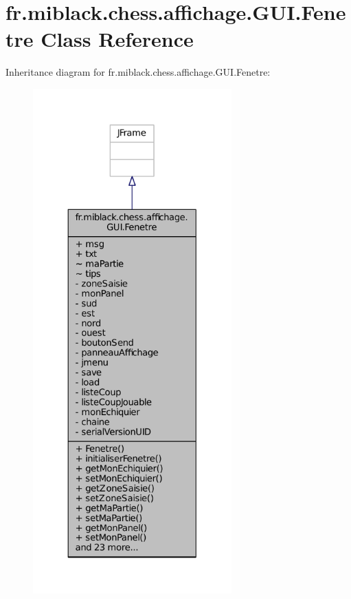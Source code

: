 \section{fr.\-miblack.\-chess.\-affichage.\-G\-U\-I.\-Fenetre Class Reference}
\label{classfr_1_1miblack_1_1chess_1_1affichage_1_1GUI_1_1Fenetre}


Inheritance diagram for fr.\-miblack.\-chess.\-affichage.\-G\-U\-I.\-Fenetre\-:
\nopagebreak
\begin{figure}[H]
\begin{center}
\leavevmode
\includegraphics[height=550pt]{classfr_1_1miblack_1_1chess_1_1affichage_1_1GUI_1_1Fenetre__inherit__graph}
\end{center}
\end{figure}


